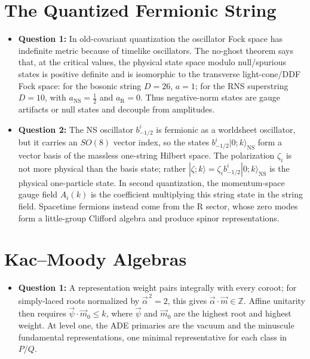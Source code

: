 \documentclass[
  10pt,
  a4paper,
  openany]{book}
\providecommand{\tightlist}{%
  \setlength{\itemsep}{0pt}\setlength{\parskip}{0pt}}
\begin{document}
\section{The Quantized Fermionic
String}\label{the-quantized-fermionic-string}

\begin{itemize}
\tightlist
\item
  \textbf{Question 1:} In old-covariant quantization the oscillator Fock
  space has indefinite metric because of timelike oscillators. The
  no-ghost theorem says that, at the critical values, the physical state
  space modulo null/spurious states is positive definite and is
  isomorphic to the transverse light-cone/DDF Fock space: for the
  bosonic string \(D=26\), \(a=1\); for the RNS superstring \(D=10\),
  with \(a_{\text{NS}}=\frac{1}{2}\) and \(a_{\text{R}}=0\). Thus
  negative-norm states are gauge artifacts or null states and decouple
  from amplitudes.
\item
  \textbf{Question 2:} The NS oscillator \(b_{-1/2}^i\) is fermionic as
  a worldsheet oscillator, but it carries an \(SO(8)\) vector index, so
  the states \(b_{-1/2}^i|0;k\rangle_{\text{NS}}\) form a vector basis
  of the massless one-string Hilbert space. The polarization \(\zeta_i\)
  is not more physical than the basis state; rather
  \(|\zeta;k\rangle=\zeta_i b_{-1/2}^i|0;k\rangle_{\text{NS}}\) is the
  physical one-particle state. In second quantization, the
  momentum-space gauge field \(A_i(k)\) is the coefficient multiplying
  this string state in the string field. Spacetime fermions instead come
  from the R sector, whose zero modes form a little-group Clifford
  algebra and produce spinor representations.
\end{itemize}

\section{Kac--Moody Algebras}\label{kacmoody-algebras}

\begin{itemize}
\tightlist
\item
  \textbf{Question 1:} A representation weight pairs integrally with
  every coroot; for simply-laced roots normalized by
  \(\vec\alpha^{\,2}=2\), this gives
  \(\vec\alpha\cdot\vec m\in\mathbb Z\). Affine unitarity then requires
  \(\vec\psi\cdot\vec m_0\leq k\), where \(\vec\psi\) and \(\vec m_0\)
  are the highest root and highest weight. At level one, the ADE
  primaries are the vacuum and the minuscule fundamental
  representations, one minimal representative for each class in \(P/Q\).
\end{itemize}
\end{document}
